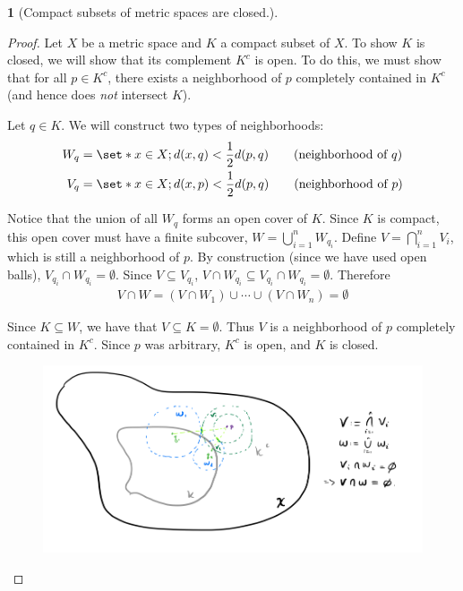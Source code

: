 \documentclass[12pt]{article}
\numberwithin{equation}{section}
\theoremstyle{plain}
\newtheorem{theorem}{\color{ForestGreen}{\textbf{Theorem}}}[section]
\theoremstyle{definition}
\def\Set{\set*}%
\newcommand{\1}{\mathbbm 1}
\begin{document}
\begin{theorem}[Compact subsets of metric spaces are closed.]
\end{theorem}
\begin{proof}
	Let $X$ be a metric space and $K$ a compact subset of $X$. To show $K$ is closed, we will show that its complement $K^c$ is open. To do this, we must show that for all $p \in K^c$, there exists a neighborhood of $p$ completely contained in $K^c$ (and hence does \emph{not} intersect $K$). 

	Let $q \in K$. We will construct two types of neighborhoods:
	\begin{align*}
		W_q &= \Set{x \in X; d(x,q) < \frac{1}{2} d(p,q)} \tag{neighborhood of $q$} \\
		V_q &= \Set{x \in X; d(x,p) < \frac{1}{2} d(p,q)} \tag{neighborhood of $p$}
	\end{align*}
	
	Notice that the union of all $W_q$ forms an open cover of $K$. Since $K$ is compact, this open cover must have a finite subcover, $W = \bigcup_{i=1}^n W_{q_i}$. Define $V = \bigcap_{i=1}^n V_i$, which is still a neighborhood of $p$. By construction (since we have used open balls), $V_{q_i} \cap W_{q_i} = \emptyset$. Since $V \subseteq V_{q_i}$, $V \cap W_{q_i} \subseteq V_{q_i} \cap W_{q_i} = \emptyset$.  Therefore
	\begin{align*}
		V \cap W = (V \cap W_1) \cup \cdots \cup (V \cap W_n) = \emptyset
	\end{align*}
	
	Since $K \subseteq W$, we have that $V \subseteq K = \emptyset$. Thus $V$ is a neighborhood of $p$ completely contained in $K^c$. Since $p$ was arbitrary, $K^c$ is open, and $K$ is closed. 
	
	
	\begin{figure}[H]
		\begin{center}
			\includegraphics[scale=.45]{compact_closed.png}
		\end{center}
	\end{figure}
\end{proof}
\end{document}
